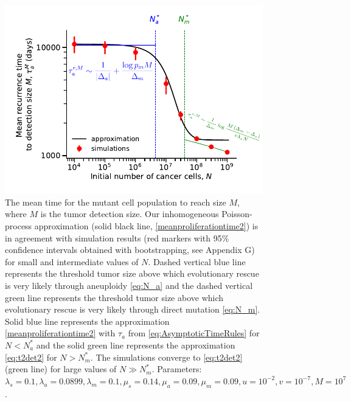 \documentclass[12pt]{extarticle}
\begin{document}
\begin{appendices}
\begin{figure}
\label{ProliferationTimeLarge}
\end{figure}
\begin{figure}
\vspace*{1\baselineskip}
\includegraphics[width=1\textwidth]{Figures/RecurrencePlot.pdf} %
\caption{The mean time for the mutant cell population to reach size $M$, where $M$ is the tumor detection size.
Our inhomogeneous Poisson-process approximation (solid black line, \cref{meanproliferationtime2}) is in agreement with simulation results (red markers with 95\% confidence intervals obtained with bootstrapping, see Appendix G) for small and intermediate values of $N$. Dashed vertical blue line represents the threshold tumor size above which evolutionary rescue is very likely through aneuploidy \cref{eq:N_a} and the dashed vertical green line represents the threshold tumor size above which evolutionary rescue is very likely through direct mutation \cref{eq:N_m}. Solid blue line represents the approximation \cref{meanproliferationtime2} with $\tau_a$ from \cref{eq:AsymptoticTimeRules} for $N<N_a^*$ and the solid green line  represents the approximation \cref{eq:t2det2} for $N>N_m^*$. The simulations converge to \cref{eq:t2det2} (green line) for large values of $N\gg N_m^*$.  Parameters: $\lambda_s=0.1,\lambda_a=0.0899,\lambda_m=0.1,\mu_s=0.14,\mu_a=0.09,\mu_m=0.09, u=10^{-2}, v=10^{-7}, M=10^7$.}
\label{RecurrencePlot}
\end{figure}
\begin{figure}
\vspace*{1\baselineskip}

\end{figure}
\end{appendices}
\end{document}
